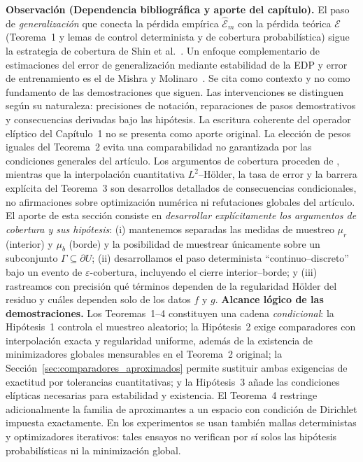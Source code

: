 \medskip
\noindent\textbf{Observación (Dependencia bibliográfica y aporte del capítulo).}
El paso de \emph{generalización} que conecta la pérdida empírica $\widehat{\mathcal{E}}_m$ con la pérdida teórica $\mathcal{E}$
(Teorema~1 y lemas de control determinista y de cobertura probabilística) sigue la estrategia de cobertura de Shin et al.~\cite{shin2020convergence}.
Un enfoque complementario de estimaciones del error de generalización mediante estabilidad de la EDP y error de entrenamiento es el de Mishra y Molinaro~\cite{mishra2023generalization}. Se cita como contexto y no como fundamento de las demostraciones que siguen.
Las intervenciones se distinguen según su naturaleza: precisiones de
notación, reparaciones de pasos demostrativos y consecuencias derivadas
bajo las hipótesis. La escritura coherente del operador elíptico del
Capítulo~1 no se presenta como aporte original. La elección de pesos
iguales del Teorema~2 evita una comparabilidad no garantizada por
las condiciones generales del artículo. Los argumentos de cobertura
proceden de \cite{shin2020convergence}, mientras que la interpolación
cuantitativa $L^2$--H\"older, la tasa de error y la barrera explícita del
Teorema~3 son desarrollos detallados de consecuencias condicionales,
no afirmaciones sobre optimización numérica ni refutaciones globales del
artículo.
El aporte de esta sección consiste en \emph{desarrollar explícitamente los argumentos de cobertura y sus hipótesis}: (i) mantenemos separadas las medidas
de muestreo $\mu_r$ (interior) y $\mu_b$ (borde) y la posibilidad de muestrear únicamente sobre un subconjunto
$\Gamma\subseteq\partial U$; (ii) desarrollamos el paso determinista ``continuo--discreto'' bajo un evento de $\varepsilon$-cobertura,
incluyendo el cierre interior--borde; y (iii) rastreamos con precisión qué términos dependen de la regularidad Hölder del residuo y
cuáles dependen solo de los datos $f$ y $g$.
\medskip
\noindent\textbf{Alcance lógico de las demostraciones.}
Los Teoremas~1--4 constituyen una cadena \emph{condicional}: la Hipótesis~1
controla el muestreo aleatorio; la Hipótesis~2 exige comparadores con
interpolación exacta y regularidad uniforme, además de la existencia de
minimizadores globales mensurables en el Teorema~2 original; la Sección~\ref{sec:comparadores_aproximados}
permite sustituir ambas exigencias de exactitud por tolerancias cuantitativas; y la Hipótesis~3 añade las condiciones
elípticas necesarias para estabilidad y existencia. El Teorema~4 restringe
adicionalmente la familia de aproximantes a un espacio con condición de
Dirichlet impuesta exactamente. En los experimentos se usan también mallas
deterministas y optimizadores iterativos: tales ensayos no verifican por sí
solos las hipótesis probabilísticas ni la minimización global.

